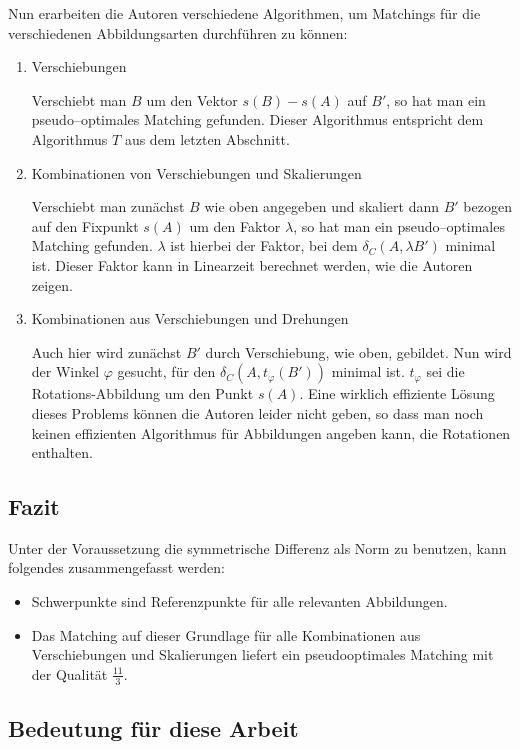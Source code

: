 Nun erarbeiten die Autoren verschiedene Algorithmen, um Matchings für die verschiedenen Abbildungsarten durchführen zu können:
\begin{enumerate}
\item Verschiebungen

Verschiebt man $B$ um den Vektor $s(B)-s(A)$ auf $B'$, so hat man ein pseudo--optimales Matching gefunden. Dieser Algorithmus entspricht dem Algorithmus $T$ aus dem letzten Abschnitt.

\item Kombinationen von Verschiebungen und Skalierungen

Verschiebt man zunächst $B$ wie oben angegeben und skaliert dann $B'$ bezogen auf den Fixpunkt $s(A)$ um den Faktor $\lambda$, so hat man ein pseudo--optimales Matching gefunden. $\lambda$ ist hierbei der Faktor, bei dem $\delta_C(A,\lambda B')$ minimal ist. Dieser Faktor kann in Linearzeit berechnet werden, wie die Autoren zeigen.

\item Kombinationen aus Verschiebungen und Drehungen

Auch hier wird zunächst $B'$ durch Verschiebung, wie oben, gebildet. Nun wird der Winkel $\varphi$ gesucht, für den $\delta_C(A,t_\varphi( B'))$ minimal ist. $t_\varphi$ sei die Rotations-Abbildung um den Punkt $s(A)$. Eine wirklich effiziente Lösung dieses Problems können die Autoren leider nicht geben, so dass man noch keinen effizienten Algorithmus für Abbildungen angeben kann, die Rotationen enthalten. 
\end{enumerate}

\subsection{Fazit}

Unter der Voraussetzung die symmetrische Differenz als Norm zu benutzen, kann folgendes zusammengefasst werden:
\begin{itemize}
\item Schwerpunkte sind Referenzpunkte für alle relevanten Abbildungen.
\item Das Matching auf dieser Grundlage für alle Kombinationen aus Verschiebungen und Skalierungen liefert ein pseudooptimales Matching mit der Qualität $\frac{11}{3}$. 
\end{itemize} 
\subsection{Bedeutung für diese Arbeit}\label{BedeutungAFRW}


